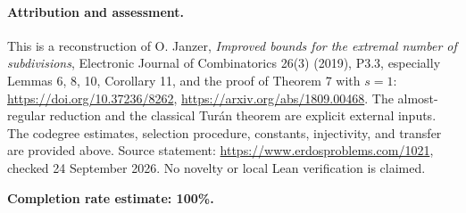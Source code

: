 \paragraph{Attribution and assessment.}
This is a reconstruction of O. Janzer, \emph{Improved bounds for the extremal number of subdivisions}, Electronic Journal of Combinatorics 26(3) (2019), P3.3, especially Lemmas 6, 8, 10, Corollary 11, and the proof of Theorem 7 with \(s=1\): \url{https://doi.org/10.37236/8262}, \url{https://arxiv.org/abs/1809.00468}. The almost-regular reduction and the classical Tur\'an theorem are explicit external inputs. The codegree estimates, selection procedure, constants, injectivity, and transfer are provided above. Source statement: \url{https://www.erdosproblems.com/1021}, checked 24 September 2026. No novelty or local Lean verification is claimed.

\textbf{Completion rate estimate: 100\%.}
